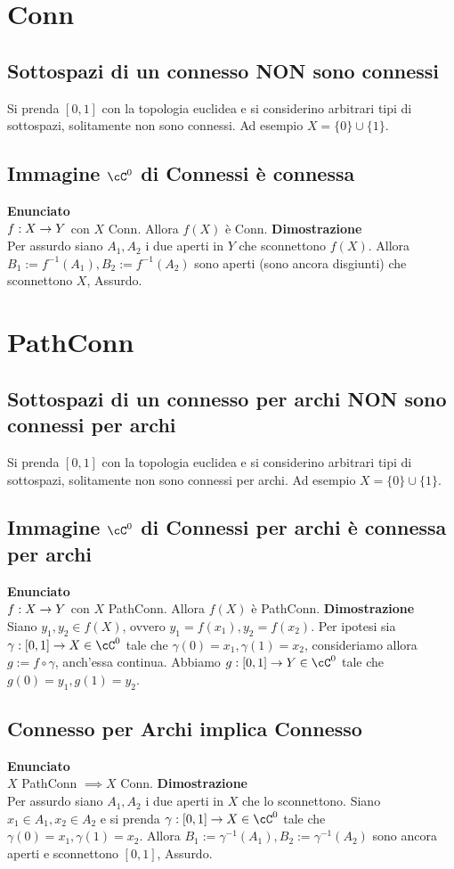 \documentclass[a4paper,11pt,NoNotes,GeneralMath]{stdmdoc}
\newcommand{\Enunciato}{\vskip 0.05cm \noindent \textbf{Enunciato} \\ }
\renewcommand{\Dimostrazione}{\vskip 0.05cm \noindent \textbf{Dimostrazione} \\ }
\begin{document}
	\section*{Conn}
	\subsection*{Sottospazi di un connesso NON sono connessi}
	Si prenda $[0,1]$ con la topologia euclidea e si considerino arbitrari tipi di sottospazi, solitamente non sono connessi. Ad esempio $X = \{0\} \cup \{1\}$.

	\subsection*{Immagine $\cC^0$ di Connessi è connessa}
	\Enunciato $f: X \rightarrow Y$ con $X$ Conn. Allora $f(X)$ è Conn.
	\Dimostrazione Per assurdo siano $A_1, A_2$ i due aperti in $Y$ che sconnettono $f(X)$. Allora $B_1 := f^{-1}(A_1), B_2 := f^{-1}(A_2)$ sono aperti (sono ancora disgiunti) che sconnettono $X$, Assurdo.

	\section*{PathConn}
	\subsection*{Sottospazi di un connesso per archi NON sono connessi per archi}
	Si prenda $[0,1]$ con la topologia euclidea e si considerino arbitrari tipi di sottospazi, solitamente non sono connessi per archi. Ad esempio $X = \{0\} \cup \{1\}$.

	\subsection*{Immagine $\cC^0$ di Connessi per archi è connessa per archi}
	\Enunciato $f: X \rightarrow Y$ con $X$ PathConn. Allora $f(X)$ è PathConn.
	\Dimostrazione Siano $y_1, y_2 \in f(X)$, ovvero $y_1 = f(x_1), y_2 = f(x_2)$. Per ipotesi sia $\gamma: [0,1] \rar X \in \cC^0$ tale che $\gamma(0) = x_1, \gamma(1) = x_2$, consideriamo allora $g := f \circ \gamma$, anch'essa continua. Abbiamo $g: [0,1] \rar Y \in \cC^0$ tale che $g(0) = y_1, g(1) = y_2$.

	\subsection*{Connesso per Archi implica Connesso}
	\Enunciato $X$ PathConn $\implies X$ Conn.
	\Dimostrazione Per assurdo siano $A_1, A_2$ i due aperti in $X$ che lo sconnettono. Siano $x_1 \in A_1, x_2 \in A_2$ e si prenda $\gamma: [0,1] \rar X \in \cC^0$ tale che $\gamma(0) = x_1, \gamma(1) = x_2$. Allora $B_1 := \gamma^{-1}(A_1), B_2 := \gamma^{-1}(A_2)$ sono ancora aperti e sconnettono $[0,1]$, Assurdo.
\end{document}
